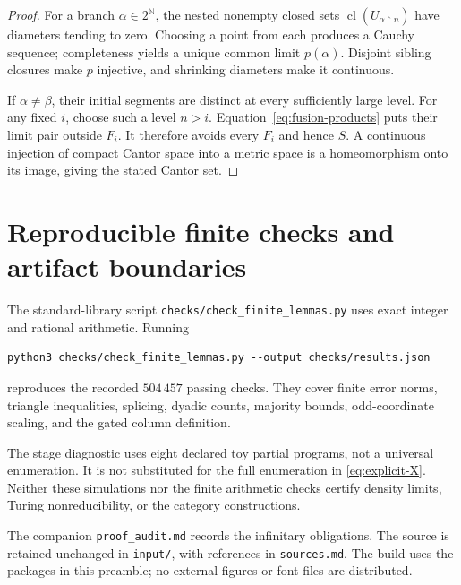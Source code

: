 \documentclass[11pt,a4paper]{article}
\newcommand{\N}{\mathbb N}
\newcommand{\restrict}{\mathbin{\upharpoonright}}
\newcommand{\cl}{\operatorname{cl}}
\newcommand{\code}[1]{\texttt{#1}}
\theoremstyle{definition}\newtheorem{definition}[theorem]{Definition}
\theoremstyle{remark}\newtheorem{remark}[theorem]{Remark}
\begin{document}
\begin{proof}
For a branch $\alpha\in2^{\N}$, the nested nonempty closed sets $\cl(U_{\alpha\restrict n})$ have diameters tending to zero. Choosing a point from each produces a Cauchy sequence; completeness yields a unique common limit $p(\alpha)$. Disjoint sibling closures make $p$ injective, and shrinking diameters make it continuous.

If $\alpha\ne\beta$, their initial segments are distinct at every sufficiently large level. For any fixed $i$, choose such a level $n>i$. Equation~\eqref{eq:fusion-products} puts their limit pair outside $F_i$. It therefore avoids every $F_i$ and hence $S$. A continuous injection of compact Cantor space into a metric space is a homeomorphism onto its image, giving the stated Cantor set.
\end{proof}

\section{Reproducible finite checks and artifact boundaries}
\label{app:checks}
The standard-library script \code{checks/check\_finite\_lemmas.py} uses exact integer and rational arithmetic. Running
\begin{lstlisting}
python3 checks/check_finite_lemmas.py --output checks/results.json
\end{lstlisting}
reproduces the recorded $504\,457$ passing checks. They cover finite error norms, triangle inequalities, splicing, dyadic counts, majority bounds, odd-coordinate scaling, and the gated column definition.

The stage diagnostic uses eight declared toy partial programs, not a universal enumeration. It is not substituted for the full enumeration in \eqref{eq:explicit-X}. Neither these simulations nor the finite arithmetic checks certify density limits, Turing nonreducibility, or the category constructions.

The companion \code{proof\_audit.md} records the infinitary obligations. The source is retained unchanged in \code{input/}, with references in \code{sources.md}. The build uses the packages in this preamble; no external figures or font files are distributed.
\end{document}
